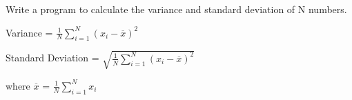 \documentclass[a4paper,12pt]{article}
\begin{document}
Write a program to calculate the variance and standard deviation of N numbers.

Variance = $\frac{1}{N}\sum_{i=1}^N(x_{i}-\overline{x})^2$

Standard Deviation = $\sqrt{\frac{1}{N}\sum_{i=1}^N(x_{i}-\overline{x})^2}$

where $\overline{x}$ = $\frac{1}{N}\sum_{i=1}^Nx_{i}$
\end{document}
